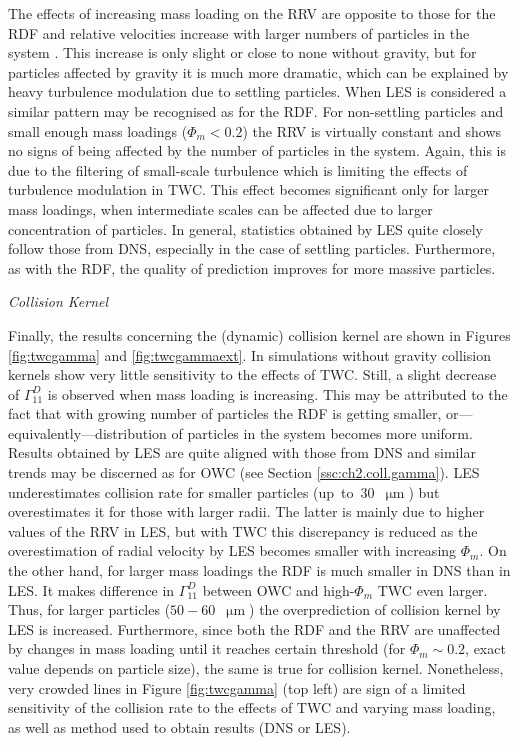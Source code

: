 \documentclass{pracamgren}
\begin{document}
The effects of increasing mass loading on the RRV are opposite to those for the RDF and relative velocities increase with larger numbers of particles in the system \parencite[Fig. 23 and 24 therein]{Rosa2020}.
This increase is only slight or close to none without gravity, but for particles affected by gravity it is much more dramatic, which can be explained by heavy turbulence modulation due to settling particles.
When LES is considered a similar pattern may be recognised as for the RDF.
For non-settling particles and small enough mass loadings (${\Phi_m < 0.2}$) the RRV is virtually constant and shows no signs of being affected by the number of particles in the system.
Again, this is due to the filtering of small-scale turbulence which is limiting the effects of turbulence modulation in TWC.
This effect becomes significant only for larger mass loadings, when intermediate scales can be affected due to larger concentration of particles.
In general, statistics obtained by LES quite closely follow those from DNS, especially in the case of settling particles.
Furthermore, as with the RDF, the quality of prediction improves for more massive particles.  
 
\medskip

\emph{Collision Kernel}

Finally, the results concerning the (dynamic) collision kernel are shown in Figures \ref{fig:twcgamma} and \ref{fig:twcgammaext}.
In simulations without gravity collision kernels show very little sensitivity to the effects of TWC.
Still, a slight decrease of $\Gamma^D_{11}$ is observed when mass loading is increasing.
This may be attributed to the fact that with growing number of particles the RDF is getting smaller, or---equivalently---distribution of particles in the system becomes more uniform.
Results obtained by LES are quite aligned with those from DNS and similar trends may be discerned as for OWC (see Section \ref{ssc:ch2.coll.gamma}).
LES underestimates collision rate for smaller particles (up~to~$30$~$\upmu\text{m}$) but overestimates it for those with larger radii.
The latter is mainly due to higher values of the RRV in LES, but with TWC this discrepancy is reduced as the overestimation of radial velocity by LES becomes smaller with increasing $\Phi_m$.
On the other hand, for larger mass loadings the RDF is much smaller in DNS than in LES.
It makes difference in $\Gamma^D_{11}$ between OWC and high-$\Phi_m$ TWC even larger.
Thus, for larger particles ($50-60$~$\upmu\text{m}$) the overprediction of collision kernel by LES is increased.
Furthermore, since both the RDF and the RRV are unaffected by changes in mass loading until it reaches certain threshold (for $\Phi_m \sim 0.2$, exact value depends on particle size), the same is true for collision kernel.
Nonetheless, very crowded lines in Figure \ref{fig:twcgamma} (top left) are sign of a limited sensitivity of the collision rate to the effects of TWC and varying mass loading, as well as method used to obtain results (DNS or LES).
 
\end{document}
